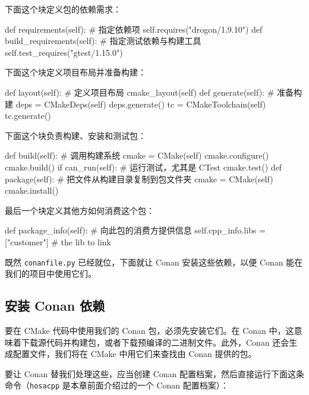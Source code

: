 下面这个块定义包的依赖需求：

\begin{codebox}[python]
    def requirements(self):
        # 指定依赖项
        self.requires("drogon/1.9.10")
    def build_requirements(self):
        # 指定测试依赖与构建工具
        self.test_requires("gtest/1.15.0")
\end{codebox}

下面这个块定义项目布局并准备构建：

\begin{codebox}[python]
    def layout(self):
        # 定义项目布局
        cmake_layout(self)
    def generate(self):
        # 准备构建
        deps = CMakeDeps(self)
        deps.generate()
        tc = CMakeToolchain(self)
        tc.generate()
\end{codebox}

\label{idx:733}
下面这个块负责构建、安装和测试包：

\begin{codebox}[python]
    def build(self):
        # 调用构建系统
        cmake = CMake(self)
        cmake.configure()
        cmake.build()
        if can_run(self):
            # 运行测试，尤其是 CTest
            cmake.test()
    def package(self):
        # 把文件从构建目录复制到包文件夹
        cmake = CMake(self)
        cmake.install()
\end{codebox}

最后一个块定义其他方如何消费这个包：

\begin{codebox}[python]
    def package_info(self):
        # 向此包的消费方提供信息
        self.cpp_info.libs = ["customer"] # the lib to link
\end{codebox}

\label{idx:734}
既然 \texttt{conanfile.\allowbreak{}py} 已经就位，下面就让 Conan 安装这些依赖，以便 Conan 能在我们的项目中使用它们。

\subsection{安装 Conan 依赖}

\label{idx:735}
要在 CMake 代码中使用我们的 Conan 包，必须先安装它们。在 Conan 中，这意味着下载源代码并构建包，或者下载预编译的二进制文件。此外，Conan 还会生成配置文件，我们将在 CMake 中用它们来查找由 Conan 提供的包。

要让 Conan 替我们处理这些，应当创建 Conan 配置档案，然后直接运行下面这条命令（\texttt{hosacpp} 是本章前面介绍过的一个 Conan 配置档案）：

